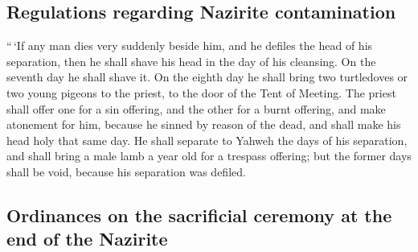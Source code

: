 \hypertarget{regulations-regarding-nazirite-contamination}{%
\subsection{Regulations regarding Nazirite
contamination}\label{regulations-regarding-nazirite-contamination}}

 ``\,`If any man dies very suddenly beside him, and he
defiles the head of his separation, then he shall shave his head in the
day of his cleansing. On the seventh day he shall shave it.
 On the eighth day he shall bring two turtledoves or two
young pigeons to the priest, to the door of the Tent of Meeting.
 The priest shall offer one for a sin offering, and the
other for a burnt offering, and make atonement for him, because he
sinned by reason of the dead, and shall make his head holy that same
day.  He shall separate to Yahweh the days of his
separation, and shall bring a male lamb a year old for a trespass
offering; but the former days shall be void, because his separation was
defiled.

\hypertarget{ordinances-on-the-sacrificial-ceremony-at-the-end-of-the-nazirite}{%
\subsection{Ordinances on the sacrificial ceremony at the end of the
Nazirite}\label{ordinances-on-the-sacrificial-ceremony-at-the-end-of-the-nazirite}}

